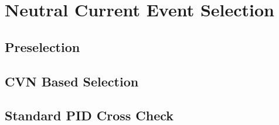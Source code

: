 \chapter{Neutral Current Event Selection}

\section{Preselection}

\section{CVN Based Selection}

\section{Standard PID Cross Check}